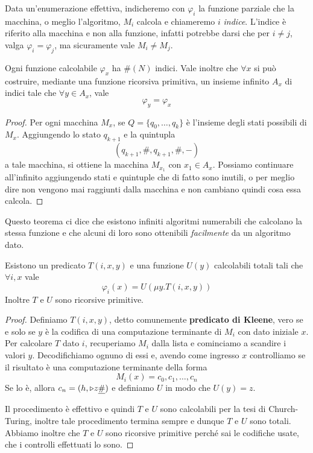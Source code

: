 Data un'enumerazione effettiva, indicheremo con $\varphi_i$ la
funzione parziale che la macchina, o meglio l'algoritmo, $M_i$
calcola e chiameremo $i$ \emph{indice}. L'indice è riferito
alla macchina e non alla funzione, infatti potrebbe darsi che
per $i \neq j$, valga $\varphi_i = \varphi_j$, ma sicuramente
vale $M_i \neq M_j$.

\begin{theorem} \label{th: padding lemma}
	Ogni funzione calcolabile $\varphi_x$ ha $\# (N)$ indici.
	Vale inoltre che $\forall x$ si può costruire, mediante una
	funzione ricorsiva primitiva, un insieme infinito $A_x$ di
	indici tale che $\forall y \in A_x$, vale
	\[ \varphi_y = \varphi_x \]
	\begin{proof}
		Per ogni macchina $M_x$, se $Q = \{ q_0, \dots, q_k \}$
		è l'insieme degli stati possibili di $M_x$. Aggiungendo
		lo stato $q_{k+1}$ e la quintupla
		\[ (q_{k+1}, \#, q_{k+1}, \#, -) \]
		a tale macchina, si ottiene la macchina $M_{x_1}$ con
		$x_1 \in A_x$. Possiamo continuare all'infinito
		aggiungendo stati e quintuple che di fatto sono inutili,
		o per meglio dire non vengono mai raggiunti dalla
		macchina e non cambiano quindi cosa essa calcola.
	\end{proof}
\end{theorem}

Questo teorema ci dice che esistono infiniti algoritmi
numerabili che calcolano la stessa funzione e che alcuni di
loro sono ottenibili \emph{facilmente} da un algoritmo dato.

\begin{theorem} \label{th: fn}
	Esistono un predicato $T(i, x, y)$ e una funzione $U(y)$
	calcolabili totali tali che $\forall i,x$ vale
	\[ \varphi_i(x) = U(\mu y . T (i, x, y)) \]
	Inoltre $T$ e $U$ sono ricorsive primitive.
	\begin{proof}
		Definiamo $T(i,x,y)$, detto comunemente
		\textbf{predicato di Kleene}, vero se e solo se $y$ è
		la codifica di una computazione terminante di $M_i$
		con dato iniziale $x$. Per calcolare $T$ dato $i$,
		recuperiamo $M_i$ dalla lista e cominciamo a scandire
		i valori $y$. Decodifichiamo ognuno di essi e, avendo
		come ingresso $x$ controlliamo se il risultato è una
		computazione terminante della forma
		\[ M_i(x) = c_0, c_1, \dots, c_n \]
		Se lo è, allora $c_n = (h, \triangleright z \underline{\#})$ e
		definiamo $U$ in modo che $U(y) = z$.

		Il procedimento è effettivo e quindi $T$ e $U$ sono
		calcolabili per la tesi di Church-Turing, inoltre tale
		procedimento termina sempre e dunque $T$ e $U$ sono
		totali. Abbiamo inoltre che $T$ e $U$ sono ricorsive
		primitive perché sai le codifiche usate, che i controlli
		effettuati lo sono.
	\end{proof}
\end{theorem}

